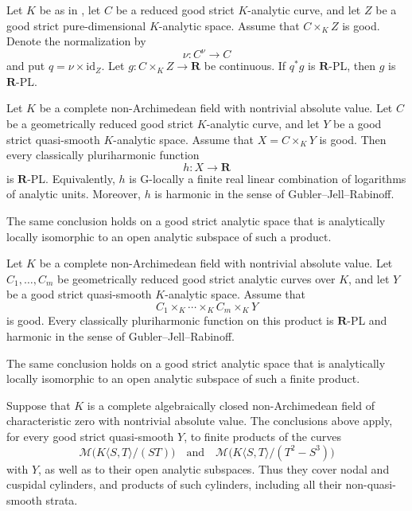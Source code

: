 \begin{proposition}
\label{prop:p061-curve-product-normalization-descent}
Let \(K\) be as in , let \(C\)
be a reduced good strict \(K\)-analytic curve, and let \(Z\) be a good
strict pure-dimensional \(K\)-analytic space.  Assume that
\(C\times_KZ\) is good.  Denote the normalization by
\[
                         \nu:C^\nu\longrightarrow C
\]
and put \(q=\nu\times\mathrm{id}_Z\).  Let
\(g:C\times_KZ\to\mathbf R\) be continuous.  If \(q^*g\) is
\(\mathbf R\)-PL, then \(g\) is \(\mathbf R\)-PL.
\end{proposition}

\begin{theorem}
\label{thm:p061-curve-product-ph-rpl}
Let \(K\) be a complete non-Archimedean field with nontrivial absolute
value.  Let \(C\) be a geometrically reduced good strict \(K\)-analytic
curve, and let \(Y\) be a good strict quasi-smooth \(K\)-analytic space.
Assume that \(X=C\times_KY\) is good.  Then every classically
pluriharmonic function
\[
                              h:X\longrightarrow\mathbf R
\]
is \(\mathbf R\)-PL.  Equivalently, \(h\) is G-locally a finite real
linear combination of logarithms of analytic units.  Moreover, \(h\) is
harmonic in the sense of Gubler--Jell--Rabinoff.

The same conclusion holds on a good strict analytic space that is
analytically locally isomorphic to an open analytic subspace of such a
product.
\end{theorem}

\begin{corollary}
\label{cor:p061-finite-curve-products-ph-rpl}
Let \(K\) be a complete non-Archimedean field with nontrivial absolute
value.  Let \(C_1,\ldots,C_m\) be geometrically reduced good strict
analytic curves over \(K\), and let \(Y\) be a good strict quasi-smooth
\(K\)-analytic space.  Assume that
\[
                   C_1\times_K\cdots\times_KC_m\times_KY
\]
is good.  Every classically pluriharmonic function on this product is
\(\mathbf R\)-PL and harmonic in the sense of
Gubler--Jell--Rabinoff.

The same conclusion holds on a good strict analytic space that is
analytically locally isomorphic to an open analytic subspace of such a
finite product.
\end{corollary}

\begin{example}
\label{ex:p061-nodal-cuspidal-products}
Suppose that \(K\) is a complete algebraically closed non-Archimedean
field of characteristic zero with nontrivial absolute value.  The
conclusions above apply, for every good strict quasi-smooth \(Y\), to
finite products of the curves
\[
 \mathcal M\bigl(K\langle S,T\rangle/(ST)\bigr)
 \quad\text{and}\quad
 \mathcal M\bigl(K\langle S,T\rangle/(T^2-S^3)\bigr)
\]
with \(Y\), as well as to their open analytic subspaces.  Thus they cover
nodal and cuspidal cylinders, and products of such cylinders, including
all their non-quasi-smooth strata.
\end{example}
